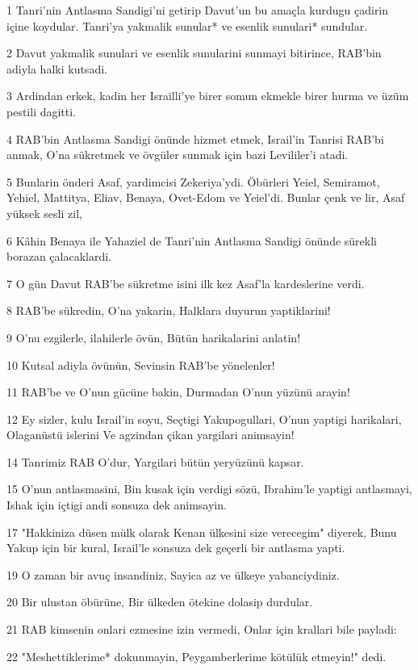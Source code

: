 \par 1 Tanri'nin Antlasma Sandigi'ni getirip Davut'un bu amaçla kurdugu çadirin içine koydular. Tanri'ya yakmalik sunular* ve esenlik sunulari* sundular.
\par 2 Davut yakmalik sunulari ve esenlik sunularini sunmayi bitirince, RAB'bin adiyla halki kutsadi.
\par 3 Ardindan erkek, kadin her Israilli'ye birer somun ekmekle birer hurma ve üzüm pestili dagitti.
\par 4 RAB'bin Antlasma Sandigi önünde hizmet etmek, Israil'in Tanrisi RAB'bi anmak, O'na sükretmek ve övgüler sunmak için bazi Levililer'i atadi.
\par 5 Bunlarin önderi Asaf, yardimcisi Zekeriya'ydi. Öbürleri Yeiel, Semiramot, Yehiel, Mattitya, Eliav, Benaya, Ovet-Edom ve Yeiel'di. Bunlar çenk ve lir, Asaf yüksek sesli zil,
\par 6 Kâhin Benaya ile Yahaziel de Tanri'nin Antlasma Sandigi önünde sürekli borazan çalacaklardi.
\par 7 O gün Davut RAB'be sükretme isini ilk kez Asaf'la kardeslerine verdi.
\par 8 RAB'be sükredin, O'na yakarin, Halklara duyurun yaptiklarini!
\par 9 O'nu ezgilerle, ilahilerle övün, Bütün harikalarini anlatin!
\par 10 Kutsal adiyla övünün, Sevinsin RAB'be yönelenler!
\par 11 RAB'be ve O'nun gücüne bakin, Durmadan O'nun yüzünü arayin!
\par 12 Ey sizler, kulu Israil'in soyu, Seçtigi Yakupogullari, O'nun yaptigi harikalari, Olaganüstü islerini Ve agzindan çikan yargilari animsayin!
\par 14 Tanrimiz RAB O'dur, Yargilari bütün yeryüzünü kapsar.
\par 15 O'nun antlasmasini, Bin kusak için verdigi sözü, Ibrahim'le yaptigi antlasmayi, Ishak için içtigi andi sonsuza dek animsayin.
\par 17 "Hakkiniza düsen mülk olarak Kenan ülkesini size verecegim" diyerek, Bunu Yakup için bir kural, Israil'le sonsuza dek geçerli bir antlasma yapti.
\par 19 O zaman bir avuç insandiniz, Sayica az ve ülkeye yabanciydiniz.
\par 20 Bir ulustan öbürüne, Bir ülkeden ötekine dolasip durdular.
\par 21 RAB kimsenin onlari ezmesine izin vermedi, Onlar için krallari bile payladi:
\par 22 "Meshettiklerime* dokunmayin, Peygamberlerime kötülük etmeyin!" dedi.
